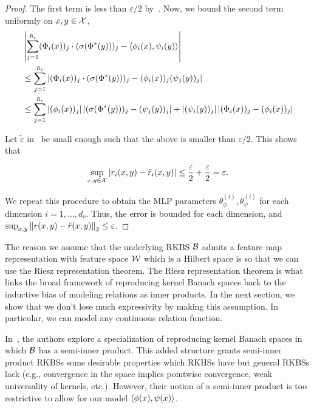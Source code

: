 \begin{proof}
    The first term is less than $\varepsilon / 2$ by~. Now, we bound the second term uniformly on $x,y \in {\mathcal{X}}$,
    \begin{align*}
        &\left\lvert\sum_{j=1}^{\tilde{n}_i} (\Phi_i(x))_j \cdot (\sigma(\Phi^*(y)))_j - \left \langle \phi_i(x), \psi_i(y) \right\rangle\right\rvert \\
        &\leq \sum_{j=1}^{\tilde{n}_i} \left\lvert(\Phi_i(x))_j \cdot (\sigma(\Phi^*(y)))_j - (\phi_i(x))_j(\psi_j(y))_j\right\rvert \\
        &\leq \sum_{j=1}^{\tilde{n}_i} \left\lvert(\phi_i(x))_j\right\rvert \left\lvert(\sigma(\Phi^*(y)))_j - (\psi_j(y))_j\right\rvert + \left\lvert(\psi_i(y))_j\right\rvert \left\lvert(\Phi_i(x))_j - (\phi_i(x))_j\right\rvert\\
    \end{align*}

    Let $\tilde{\varepsilon}$ in~ be small enough such that the above is smaller than $\varepsilon / 2$. This shows that

    \begin{equation*}
        \sup_{x,y \in {\mathcal{X}}} \left\lvert r_i(x,y) - \tilde{r}_i(x,y)\right\rvert \leq \frac{\varepsilon}{2} + \frac{\varepsilon}{2} = \varepsilon.
    \end{equation*}

    We repeat this procedure to obtain the MLP parameters $\theta_\phi^{(i)}, \theta_{\psi}^{(i)}$ for each dimension $i = 1, \ldots, d_r$. Thus, the error is bounded for each dimension, and $\sup_{x,y} \left\lVert r(x, y) - \tilde{r}(x, y)\right\rVert_2 \leq \varepsilon$.
\end{proof}

\begin{remark}
    The reason we assume that the underlying RKBS ${\mathcal{B}}$ admits a feature map representation with feature space ${\mathcal{W}}$ which is a Hilbert space is so that we can use the Riesz representation theorem. The Riesz representation theorem is what links the broad framework of reproducing kernel Banach spaces back to the inductive bias of modeling relations as inner products. In the next section, we show that we don't lose much expressivity by making this assumption. In particular, we can model any continuous relation function.
\end{remark}

\begin{remark}
    In~\parencite{zhangReproducingKernel2009}, the authors explore a specialization of reproducing kernel Banach spaces in which ${\mathcal{B}}$ has a semi-inner product. This added structure grants semi-inner product RKBSs some desirable properties which RKHSs have but general RKBSs lack (e.g., convergence in the space implies pointwise convergence, weak universality of kernels, etc.). However, their notion of a semi-inner product is too restrictive to allow for our model $\left \langle \phi(x), \psi(x) \right\rangle$.
\end{remark}

